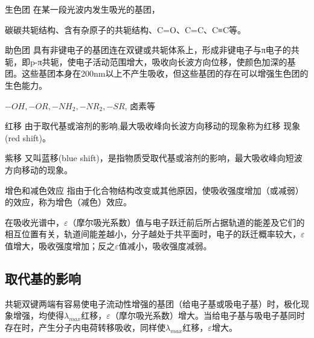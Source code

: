 \begin{definition*}{生色团}
    在某一段光波内发生吸光的基团，
    \begin{example}
        碳碳共轭结构、含有杂原子的共轭结构、C=O、C=C、C≡C等。
    \end{example}
\end{definition*}
\begin{definition*}{助色团}
    具有非键电子的基团连在双键或共轭体系上，形成非键电子与π电子的共轭，即p-π共轭，使电子活动范围增大，吸收向长波方向位移，使颜色加深的基团。这些基团本身在200nm以上不产生吸收，但这些基团的存在可以增强生色团的生色能力。
    \begin{example}
        $-OH,-OR, -NH_{2}, -NR_{2}, -SR$, 卤素等
    \end{example}
\end{definition*}
\begin{definition*}{红移}
    由于取代基或溶剂的影响,最大吸收峰向长波方向移动的现象称为红移 现象 (red shift)。
\end{definition*}
\begin{definition*}{紫移}
    又叫蓝移(blue shift)，是指物质受取代基或溶剂的影响，最大吸收峰向短波方向移动的现象。
\end{definition*}
\begin{definition*}{增色和减色效应}
    指由于化合物结构改变或其他原因，使吸收强度增加（或减弱）的效应，称为增色（减色）效应。
\end{definition*}
\begin{note}
    在吸收光谱中，$\varepsilon $（摩尔吸光系数）值与电子跃迁前后所占据轨道的能差及它们的相互位置有关，轨道间能差越小，分子越处于共平面时，电子的跃迁概率较大，$\varepsilon $值增大，吸收强度增加；反之$\varepsilon$值减小，吸收强度减弱。
\end{note}
\subsection{取代基的影响} 
共轭双键两端有容易使电子流动性增强的基团（给电子基或吸电子基）时，极化现象增强，均使得$\lambda_{max}$红移，$\varepsilon$（摩尔吸光系数）增大。当给电子基与吸电子基同时存在时，产生分子内电荷转移吸收，同样使$\lambda_{max}$红移，$\varepsilon$增大。


